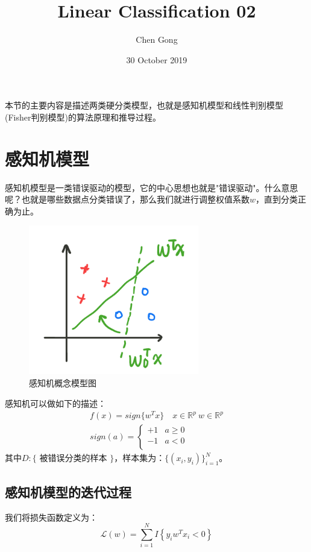 \documentclass[a4paper]{article}
\title{Linear Classification 02}
\author{Chen Gong}
\date{30 October 2019}
\begin{document}
\maketitle
本节的主要内容是描述两类硬分类模型，也就是感知机模型和线性判别模型(Fisher判别模型)的算法原理和推导过程。

\section{感知机模型}
感知机模型是一类错误驱动的模型，它的中心思想也就是"错误驱动"。什么意思呢？也就是哪些数据点分类错误了，那么我们就进行调整权值系数$w$，直到分类正确为止。

\begin{figure}[H]
    \centering
    \includegraphics[width=.4\textwidth]{微信图片_20191030090710.png}
    \caption{感知机概念模型图}
    \label{fig:my_label_1}
\end{figure}

感知机可以做如下的描述：
\begin{gather}
    f(x)=sign\{ w^Tx \} \quad x\in \mathbb{R}^p \ w\in  \mathbb{R}^p \\
    sign(a)=
    \left\{
    \begin{array}{ll}
      +1 & a \geq 0 \\
      -1 & a < 0 \\
    \end{array}
    \right.
\end{gather}
其中$D:\{$ 被错误分类的样本 $\}$，样本集为：$\{(x_i,y_i)\}_{i=1}^N$。

\subsection{感知机模型的迭代过程}
我们将损失函数定义为：
\begin{equation}
    \mathcal{L}(w)=\sum_{i=1}^NI\left\{ y_iw^Tx_i < 0 \right\}
\end{equation}
\end{document}

